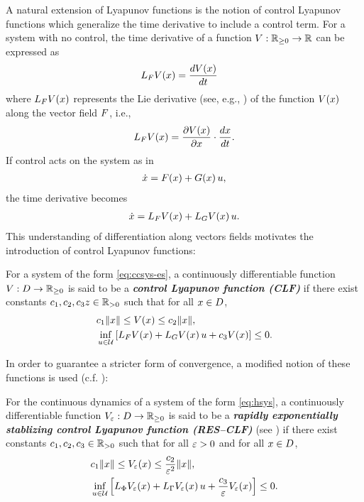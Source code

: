 A natural extension of Lyapunov functions is the notion of control Lyapunov
functions which generalize the time derivative to include a control term.
%
For a system with no control, the time derivative of a function $V : \mathbb{R}_{\geq 0} \to
\mathbb{R}$ can be expressed as
\begin{align*}
  L_{F} V(x) &= \frac{dV(x)}{dt}
\end{align*}
where $L_{F} V(x)$ represents the Lie derivative (see, e.g.,
\cite{Sastry1999}) of the function $V(x)$ along the vector field
$F$, i.e.,
\begin{align*}
  L_{F} V(x) = \frac{\partial{V(x)}}{\partial{x}} \cdot \frac{dx}{dt}.
\end{align*}
%
If control acts on the system as in
\begin{align}
  \label{eq:ccsys-es}
  {\dot {x}} = F(x) + G(x) \, u,
\end{align}
the time derivative becomes
\begin{align*}
  {\dot {x}} = L_{F} V(x) + L_{G} V(x) \, u.
\end{align*}
%
This understanding of differentiation along vectors fields motivates the
introduction of control Lyapunov functions:
%
\begin{definition}
  \label{def:res-clf}
  For a system of the form \eqref{eq:ccsys-es}, a continuously differentiable
  function $V : D \to \mathbb{R}_{\geq 0}$ is said to be a {\bf \em control Lyapunov function
    (CLF)} if there exist constants $c_{1}, c_{2}, c_{3}z \in \mathbb{R}_{> 0}$ such
  that for all $x \in D$,
  \begin{eqnarray*}
    &c_{1} \|x\| \leq V(x) \leq c_{2} \|x\|,\\
    &\inf_{u \in \mathcal{U}} \left[ L_{F} V(x) + L_{G} V(x) \, u + c_{3}
      V(x) \right] \leq 0.
  \end{eqnarray*}
\end{definition}

% 
In order to guarantee a stricter form of convergence, a modified notion of these
functions is used (c.f. \cite{Ames2014}):

\begin{definition}
  \label{def:res-clf}
  For the continuous dynamics of a system of the form \eqref{eq:hsys}, a
  continuously differentiable function $V_{\varepsilon} : D \to \mathbb{R}_{\geq 0}$ is said
  to be a {\bf \em rapidly exponentially stablizing control Lyapunov function
    (RES--CLF)} (see \cite{Ames2014}) if there exist constants $c_{1}, c_{2},
  c_{3} \in \mathbb{R}_{> 0}$ such that for all $\varepsilon > 0$ and for all $x \in D$,
  \begin{eqnarray*}
    &c_{1} \|x\| \leq V_{\varepsilon}(x) \leq \frac{c_{2}}{\varepsilon^{2}} \|x\|,\\
    &\inf_{u \in \mathcal{U}} \left[ L_{\Phi} V_{\varepsilon}(x) + L_{\Gamma} V_{\varepsilon}(x) \, u +
      \frac{c_{3}}{\varepsilon} V_{\varepsilon}(x) \right] \leq 0.
  \end{eqnarray*}
\end{definition}

